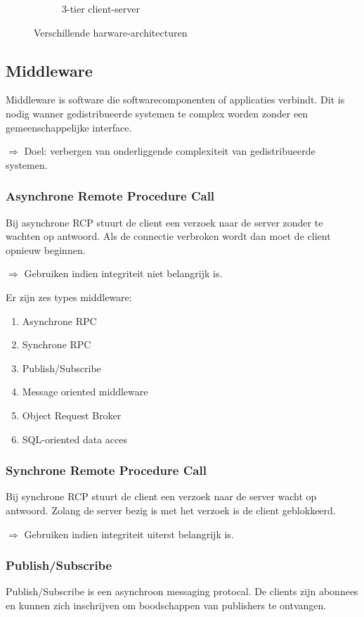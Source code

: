 \documentclass[a4paper,12pt]{article}
\begin{document}
\begin{figure}[H]
\begin{subfigure}{.49\textwidth}
  \caption{3-tier client-server}
  \label{fig:Tier3Server}
\end{subfigure}
\caption{Verschillende harware-architecturen}
\label{fig:HardwareArchitecturen}
\end{figure}

\subsection{Middleware}
Middleware is software die softwarecomponenten of applicaties verbindt.
Dit is nodig wanner gedistribueerde systemen te complex worden zonder een gemeenschappelijke interface.

$\Rightarrow$ Doel: verbergen van onderliggende complexiteit van gedistribueerde systemen.

\subsubsection{Asynchrone Remote Procedure Call}
Bij asynchrone RCP stuurt de client een verzoek naar de server zonder te wachten op antwoord.
Als de connectie verbroken wordt dan moet de client opnieuw beginnen.

$\Rightarrow$ Gebruiken indien integriteit niet belangrijk is.

Er zijn zes types middleware:
\begin{enumerate}
\item Asynchrone RPC
\item Synchrone RPC
\item Publish/Subscribe
\item Message oriented middleware
\item Object Request Broker
\item SQL-oriented data acces
\end{enumerate}
\subsubsection{Synchrone Remote Procedure Call}
Bij synchrone RCP stuurt de client een verzoek naar de server wacht op antwoord.
Zolang de server bezig is met het verzoek is de client geblokkeerd.

$\Rightarrow$ Gebruiken indien integriteit uiterst belangrijk is.

\subsubsection{Publish/Subscribe}
Publish/Subscribe is een asynchroon messaging protocal.
De clients zijn abonnees en kunnen zich inschrijven om boodschappen van publishers te ontvangen.
\end{document}

